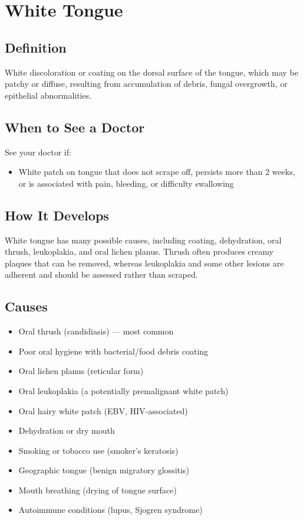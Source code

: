 \chapter{White Tongue}

\section*{Definition}
White discoloration or coating on the dorsal surface of the tongue, which may be patchy or diffuse, resulting from accumulation of debris, fungal overgrowth, or epithelial abnormalities.

\section*{When to See a Doctor}
See your doctor if:
\begin{itemize}
  \item White patch on tongue that does not scrape off, persists more than 2 weeks, or is associated with pain, bleeding, or difficulty swallowing
\end{itemize}

\section*{How It Develops}
White tongue has many possible causes, including coating, dehydration, oral thrush, leukoplakia, and oral lichen planus. Thrush often produces creamy plaques that can be removed, whereas leukoplakia and some other lesions are adherent and should be assessed rather than scraped.

\section*{Causes}
\begin{itemize}
  \item Oral thrush (candidiasis) — most common
  \item Poor oral hygiene with bacterial/food debris coating
  \item Oral lichen planus (reticular form)
  \item Oral leukoplakia (a potentially premalignant white patch)
  \item Oral hairy white patch (EBV, HIV-associated)
  \item Dehydration or dry mouth
  \item Smoking or tobacco use (smoker's keratosis)
  \item Geographic tongue (benign migratory glossitis)
  \item Mouth breathing (drying of tongue surface)
  \item Autoimmune conditions (lupus, Sjogren syndrome)
\end{itemize}

